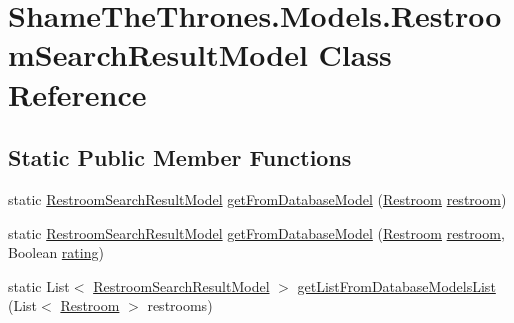 \hypertarget{class_shame_the_thrones_1_1_models_1_1_restroom_search_result_model}{}\section{Shame\+The\+Thrones.\+Models.\+Restroom\+Search\+Result\+Model Class Reference}
\label{class_shame_the_thrones_1_1_models_1_1_restroom_search_result_model}
\subsection*{Static Public Member Functions}
\begin{DoxyCompactItemize}
\item 
static \hyperlink{class_shame_the_thrones_1_1_models_1_1_restroom_search_result_model}{Restroom\+Search\+Result\+Model} \hyperlink{class_shame_the_thrones_1_1_models_1_1_restroom_search_result_model_ad9bd66ee84def39f1982305f51eb0d35}{get\+From\+Database\+Model} (\hyperlink{class_shame_the_thrones_1_1_models_1_1_db_context_1_1_restroom}{Restroom} \hyperlink{typescriptcombined_8js_a6f245fd3da421ab8da36b2973e8a3bd4}{restroom})
\item 
static \hyperlink{class_shame_the_thrones_1_1_models_1_1_restroom_search_result_model}{Restroom\+Search\+Result\+Model} \hyperlink{class_shame_the_thrones_1_1_models_1_1_restroom_search_result_model_a4e2901817e70c74737a6290e8435831e}{get\+From\+Database\+Model} (\hyperlink{class_shame_the_thrones_1_1_models_1_1_db_context_1_1_restroom}{Restroom} \hyperlink{typescriptcombined_8js_a6f245fd3da421ab8da36b2973e8a3bd4}{restroom}, Boolean \hyperlink{class_shame_the_thrones_1_1_models_1_1_restroom_search_result_model_ad6e9121e260b7c7ae8ddc5ca0a554742}{rating})
\item 
static List$<$ \hyperlink{class_shame_the_thrones_1_1_models_1_1_restroom_search_result_model}{Restroom\+Search\+Result\+Model} $>$ \hyperlink{class_shame_the_thrones_1_1_models_1_1_restroom_search_result_model_a793b29b8390fce96cfd75cbc788e4bed}{get\+List\+From\+Database\+Models\+List} (List$<$ \hyperlink{class_shame_the_thrones_1_1_models_1_1_db_context_1_1_restroom}{Restroom} $>$ restrooms)
\end{DoxyCompactItemize}
